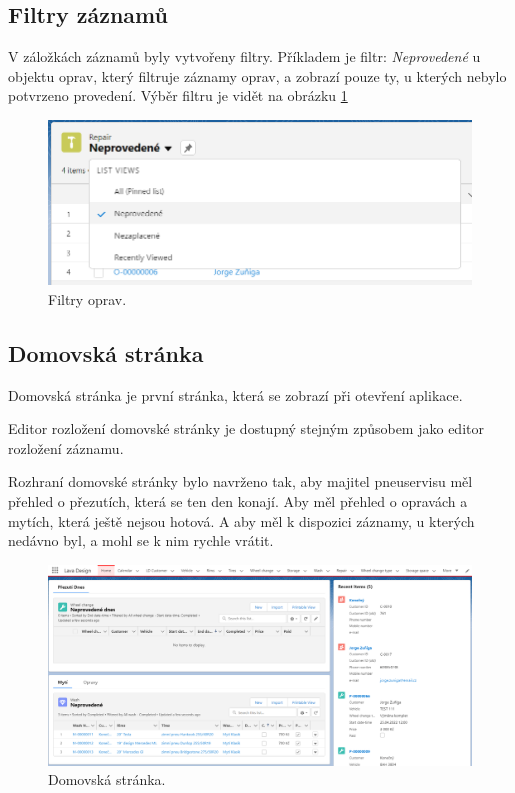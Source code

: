 \subsection{Filtry záznamů}
V záložkách záznamů byly vytvořeny filtry. Příkladem je filtr: \emph{Neprovedené} u objektu oprav, který filtruje záznamy oprav, a zobrazí pouze ty, u kterých nebylo potvrzeno provedení. Výběr filtru je vidět na obrázku \ref{fig:record_filters}
\begin{figure}[h!]
    \centering
    \includegraphics[width=\textwidth]{assets/7_implementace/uživatelské_rozhraní/Record filters.png}
    \caption{Filtry oprav.}
    \label{fig:record_filters}
\end{figure}
\FloatBarrier
\subsection{Domovská stránka}
Domovská stránka je první stránka, která se zobrazí při otevření aplikace.

Editor rozložení domovské stránky je dostupný stejným způsobem jako editor rozložení záznamu.

Rozhraní domovské stránky bylo navrženo tak, aby majitel pneuservisu měl přehled o přezutích, která se ten den konají. Aby měl přehled o opravách a mytích, která ještě nejsou hotová. A aby měl k dispozici záznamy, u kterých nedávno byl, a mohl se k nim rychle vrátit.
\begin{figure}[h!]
    \centering
    \includegraphics[width=\textwidth]{assets/7_implementace/uživatelské_rozhraní/Home page.png}
    \caption{Domovská stránka.}
    \label{fig:Home_page}
\end{figure}
\FloatBarrier
